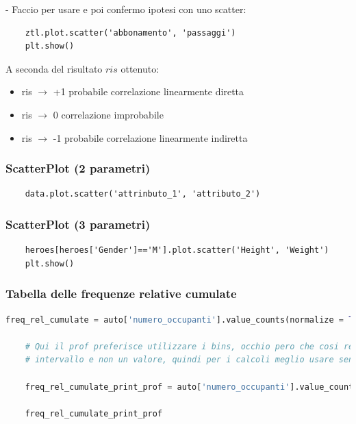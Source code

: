 \documentclass{article}
\begin{document}
- Faccio  per usare  e poi confermo ipotesi con uno scatter:

\begin{lstlisting}
    ztl.plot.scatter('abbonamento', 'passaggi')
    plt.show()
\end{lstlisting}

A seconda del risultato $ris$ ottenuto:

\begin{itemize}
    \item ris $\to$ +1 probabile correlazione linearmente diretta
    \item ris $\to$ 0 correlazione improbabile
    \item ris $\to$ -1 probabile correlazione linearmente indiretta
\end{itemize}

\subsubsection*{ScatterPlot (2 parametri)}

\begin{lstlisting}
    data.plot.scatter('attrinbuto_1', 'attributo_2')
\end{lstlisting}

\subsubsection*{ScatterPlot (3 parametri)}

\begin{lstlisting}
    heroes[heroes['Gender']=='M'].plot.scatter('Height', 'Weight')
    plt.show()
\end{lstlisting}

\subsubsection*{Tabella delle frequenze relative cumulate}

\begin{lstlisting}[language=Python]
    freq_rel_cumulate = auto['numero_occupanti'].value_counts(normalize = True).sort_index().cumsum()

    # Qui il prof preferisce utilizzare i bins, occhio pero che cosi restituisce un 
    # intervallo e non un valore, quindi per i calcoli meglio usare senza bins

    freq_rel_cumulate_print_prof = auto['numero_occupanti'].value_counts(normalize = True, bins = 10).sort_index().cumsum()

    freq_rel_cumulate_print_prof
\end{lstlisting}
\end{document}
